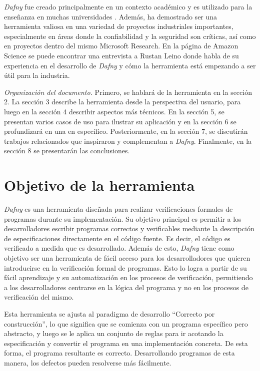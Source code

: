 \documentclass[runningheads]{llncs}
\begin{document}
\textit{Dafny} fue creado principalmente en un contexto académico y es utilizado para la enseñanza en muchas universidades \cite{DafnyALanguage}.
Además, ha demostrado ser una herramienta valiosa en una variedad de proyectos industriales importantes,
especialmente en áreas donde la confiabilidad y la seguridad son críticas,
así como en proyectos dentro del mismo Microsoft Research.
En la página de Amazon Science \cite{EntrevistaLeino} se puede encontrar una entrevista a Rustan Leino donde habla de su experiencia en el desarrollo de \textit{Dafny} y
cómo la herramienta está empezando a ser útil para la industria.

\emph{Organización del documento.} Primero, se hablará de la herramienta en la sección 2. La sección 3 describe la herramienta desde la perspectiva del usuario, para luego en la sección 4 describir aspectos más técnicos. En la sección 5, se presentan varios casos de uso para ilustrar su aplicación y en la sección 6 se profundizará en una en específico. Posteriormente, en la sección 7, se discutirán trabajos relacionados que inspiraron y complementan a \textit{Dafny}. Finalmente, en la sección 8 se presentarán las conclusiones.

\section{Objetivo de la herramienta}

\textit{Dafny} es una herramienta diseñada para realizar verificaciones formales de programas durante su implementación.
Su objetivo principal es permitir a los desarrolladores escribir programas correctos y verificables mediante la descripción
de especificaciones directamente en el código fuente. Es decir, el código es verificado a medida que es desarrollado.
Además de esto, \textit{Dafny} tiene como objetivo ser una herramienta de fácil acceso para los desarrolladores que quieren introducirse en la verificación formal de programas.
Esto lo logra a partir de su fácil aprendizaje y su automatización en los procesos de verificación, permitiendo a los desarrolladores centrarse en la lógica del programa y no en los procesos de verificación del mismo.

Esta herramienta se ajusta al paradigma de desarrollo ``Correcto por construcción'', lo que significa que se comienza
con un programa específico pero abstracto, y luego se le aplica un conjunto de reglas para ir acotando la especificación
y convertir el programa en una implementación concreta. De esta forma, el programa resultante es correcto.
Desarrollando programas de esta manera, los defectos pueden resolverse más fácilmente.
\end{document}
